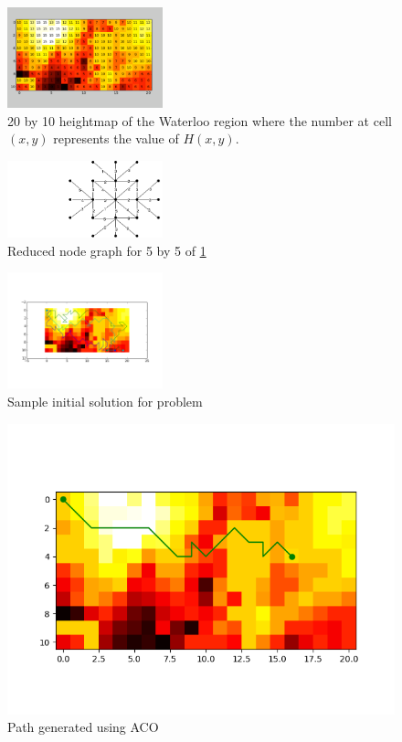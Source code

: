 \documentclass[conference]{IEEEtran}
\begin{document}
\begin{figure}[H] 
\centerline{\includegraphics[width=0.4\textwidth]{images/heightmap.png}}
\caption{20 by 10 heightmap of the Waterloo region where the number at cell $(x, y)$ represents the value of $H(x, y)$.}
\label{img:heightmap2}
\end{figure}

\begin{figure}[H]
\centerline{\includegraphics[width=0.4\textwidth]{images/nodegraph5.png}}
\caption{Reduced node graph for 5 by 5 of \ref{img:heightmap2}}
\label{img:nodegraph5}
\end{figure}

\begin{figure}[H]
\centerline{\includegraphics[width=0.4\textwidth]{images/solution_aco.png}}
\caption{Sample initial solution for problem}
\label{img:solution_aco}
\end{figure}

\begin{figure}[H]
\centerline{\includegraphics[scale=0.5]{performance/aco_1_drone}}
\caption{Path generated using ACO}
\label{img:path_aco_1_drone}
\end{figure}
\end{document}
